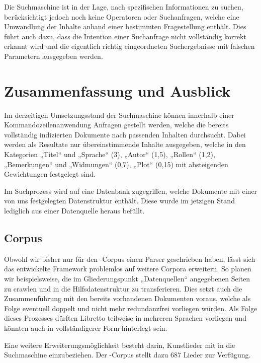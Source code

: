 Die Suchmaschine ist in der Lage, nach spezifischen Informationen zu suchen,
berücksichtigt jedoch noch keine Operatoren oder Suchanfragen,
welche eine Umwandlung der Inhalte
anhand einer bestimmten Fragestellung enthält.
Dies führt auch dazu, dass die Intention einer Suchanfrage
nicht vollständig korrekt erkannt wird
und die eigentlich richtig eingeordneten Suchergebnisse
mit falschen Parametern ausgegeben werden.

\section{Zusammenfassung und Ausblick}
Im derzeitigen Umsetzungsstand der Suchmaschine
können innerhalb einer Kommandozeilenanwendung Anfragen gestellt werden,
welche die bereits vollständig indizierten Dokumente
nach passenden Inhalten durchsucht.
Dabei werden als Resultate nur übereinstimmende Inhalte ausgegeben,
welche in den Kategorien „Titel“ und „Sprache“ (3), „Autor“ (1,5),
„Rollen“ (1,2), „Bemerkungen“ und „Widmungen“ (0,7), „Plot“ (0,15)
mit absteigenden Gewichtungen festgelegt sind.

Im Suchprozess wird auf eine Datenbank zugegriffen,
welche Dokumente mit einer von uns festgelegten Datenstruktur enthält.
Diese wurde im jetzigen Stand lediglich aus einer Datenquelle heraus befüllt.

\subsection{Corpus}
Obwohl wir bisher nur für den -Corpus
einen Parser geschrieben haben,
lässt sich das entwickelte Framework problemlos auf weitere Corpora erweitern.
So planen wir beispielsweise,
die im Gliederungspunkt „Datenquellen“ angegebenen Seiten zu crawlen
und in die Hilfsdatenstruktur zu transferieren.
Dies setzt auch die Zusammenführung
mit den bereits vorhandenen Dokumenten voraus,
welche als Folge eventuell doppelt
und nicht mehr redundanzfrei vorliegen würden.
Als Folge dieses Prozesses dürften Libretto teilweise
in mehreren Sprachen vorliegen
und könnten auch in vollständigerer Form hinterlegt sein.

Eine weitere Erweiterungsmöglichkeit besteht darin,
Kunstlieder mit in die Suchmaschine einzubeziehen.
Der -Corpus stellt dazu 687 Lieder zur Verfügung.

